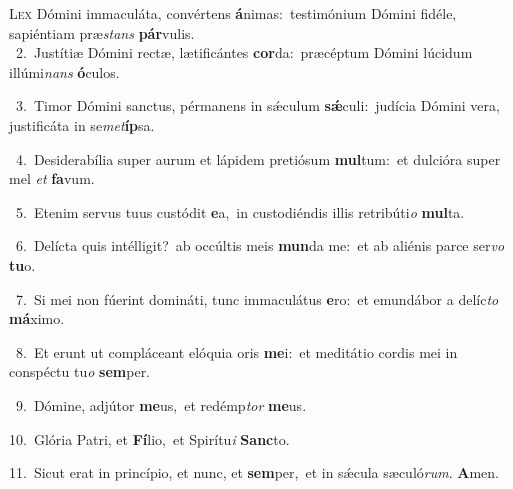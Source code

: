 \lettrine{\initial\textcolor{\initialcolor}{L}}{ex} Dómini immaculáta, convértens \textbf{á}\-nimas:~\star testimónium Dómini fidéle, sapiéntiam præ\textit{stans} \textbf{pár}\-vulis.\\
{\numbfont\textcolor{\numbcolor}{~2.}}~Justítiæ Dómini rectæ, lætificántes \textbf{cor}\-da:~\star præcéptum Dómini lúcidum illúmi\textit{nans} \textbf{ó}\-culos.\par
{\numbfont\textcolor{\numbcolor}{~3.}}~Timor Dómini sanctus, pérmanens in sǽculum \textbf{sǽ}\-culi:~\star judícia Dómini vera, justificáta in se\-\textit{met}\-\textbf{íp}sa.\par
{\numbfont\textcolor{\numbcolor}{~4.}}~Desiderabília super aurum et lápidem pretiósum \textbf{mul}\-tum:~\star et dulcióra super mel \textit{et} \textbf{fa}\-vum.\par
{\numbfont\textcolor{\numbcolor}{~5.}}~Etenim servus tuus custódit \textbf{e}\-a,~\star in custodiéndis illis retribúti\textit{o} \textbf{mul}\-ta.\par
{\numbfont\textcolor{\numbcolor}{~6.}}~Delícta quis intélligit?~\dagger ab occúltis meis \textbf{mun}\-da me:~\star et ab aliénis parce ser\textit{vo} \textbf{tu}\-o.\par
{\numbfont\textcolor{\numbcolor}{~7.}}~Si mei non fúerint domináti, tunc immaculátus \textbf{e}\-ro:~\star et emundábor a delíc\textit{to} \textbf{má}\-ximo.\par
{\numbfont\textcolor{\numbcolor}{~8.}}~Et erunt ut compláceant elóquia oris \textbf{me}\-i:~\star et meditátio cordis mei in conspéctu tu\textit{o} \textbf{sem}\-per.\par
{\numbfont\textcolor{\numbcolor}{~9.}}~Dómine, adjútor \textbf{me}\-us,~\star et redémp\textit{tor} \textbf{me}\-us.\par
{\numbfont\textcolor{\numbcolor}{10.}}~Glória Patri, et \textbf{Fí}\-lio,~\star et Spirítu\textit{i} \textbf{Sanc}\-to.\par
{\numbfont\textcolor{\numbcolor}{11.}}~Sicut erat in princípio, et nunc, et \textbf{sem}\-per,~\star et in sǽcula sæculó\-\textit{rum}\-. \textbf{A}\-men.\par
